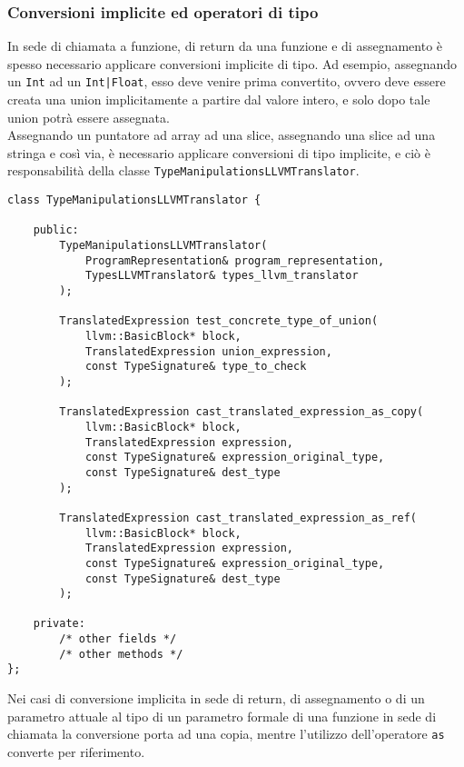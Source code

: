 \subsubsection{Conversioni implicite ed operatori di tipo}
In sede di chiamata a funzione, di return da una funzione e di assegnamento è spesso necessario applicare conversioni 
implicite di tipo. Ad esempio, assegnando un \texttt{Int} ad un \texttt{Int|Float}, esso deve venire prima convertito, 
ovvero deve essere creata una union implicitamente a partire dal valore intero, e solo dopo tale union potrà essere assegnata. \\

Assegnando un puntatore ad array ad una slice, assegnando una slice ad una stringa e così via, è necessario applicare
conversioni di tipo implicite, e ciò è responsabilità della classe \texttt{TypeManipulationsLLVMTranslator}. \\

\vspace{0.5cm}
\begin{lstlisting}[frame=single]
class TypeManipulationsLLVMTranslator {

    public:
        TypeManipulationsLLVMTranslator(
            ProgramRepresentation& program_representation, 
            TypesLLVMTranslator& types_llvm_translator
        );

        TranslatedExpression test_concrete_type_of_union(
            llvm::BasicBlock* block,
            TranslatedExpression union_expression,
            const TypeSignature& type_to_check
        );

        TranslatedExpression cast_translated_expression_as_copy(
            llvm::BasicBlock* block,
            TranslatedExpression expression,
            const TypeSignature& expression_original_type,
            const TypeSignature& dest_type
        );

        TranslatedExpression cast_translated_expression_as_ref(
            llvm::BasicBlock* block,
            TranslatedExpression expression,
            const TypeSignature& expression_original_type,
            const TypeSignature& dest_type
        );

    private:
        /* other fields */
        /* other methods */
};
\end{lstlisting}
\vspace{0.5cm}

\newpage

Nei casi di conversione implicita in sede di return, di assegnamento o di un parametro attuale al tipo di un parametro formale 
di una funzione in sede di chiamata la conversione porta ad una copia, mentre l'utilizzo dell'operatore \texttt{as} converte per riferimento. \\

